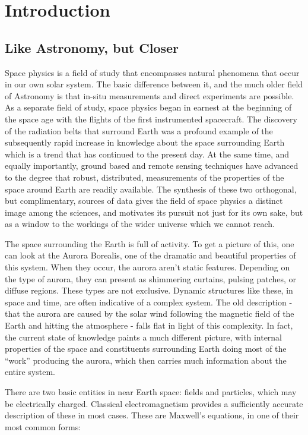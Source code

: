 \chapter{Introduction}

\section{Like Astronomy, but Closer}

Space physics is a field of study that encompasses natural phenomena that occur in our own solar system. The basic difference between it, and the much older field of Astronomy is that in-situ measurements and direct experiments are possible. As a separate field of study, space physics began in earnest at the beginning of the space age with the flights of the first instrumented spacecraft. The discovery of the radiation belts that surround Earth was a profound example of the subsequently rapid increase in knowledge about the space surrounding Earth which is a trend that has continued to the present day. At the same time, and equally importantly, ground based and remote sensing techniques have advanced to the degree that robust, distributed, measurements of the properties of the space around Earth are readily available. The synthesis of these two orthogonal, but complimentary, sources of data gives the field of space physics a distinct image among the sciences, and motivates its pursuit not just for its own sake, but as a window to the workings of the wider universe which we cannot reach.

The space surrounding the Earth is full of activity. To get a picture of this, one can look at the Aurora Borealis, one of the dramatic and beautiful properties of this system. When they occur, the aurora aren't static features. Depending on the type of aurora, they can present as shimmering curtains, pulsing patches, or diffuse regions. These types are not exclusive. Dynamic structures like these, in space and time, are often indicative of a complex system. The old description - that the aurora are caused by the solar wind following the magnetic field of the Earth and hitting the atmosphere - falls flat in light of this complexity. In fact, the current state of knowledge paints a much different picture, with internal properties of the space and constituents surrounding Earth doing most of the ``work'' producing the aurora, which then carries much information about the entire system. 

There are two basic entities in near Earth space: fields and particles, which may be electrically charged. Classical electromagnetism provides a sufficiently accurate description of these in most cases. These are Maxwell's equations, in one of their most common forms:

